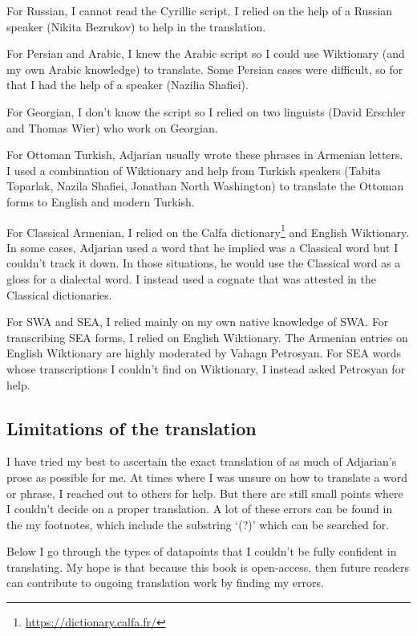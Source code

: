 For Russian, I cannot read the Cyrillic script. I relied on the help of  a Russian speaker (Nikita Bezrukov) to help in the translation. 

For Persian and Arabic, I knew the Arabic script so I could use Wiktionary (and my own Arabic knowledge) to translate. Some Persian cases were difficult, so for that I had the help of a speaker (Nazilia Shafiei). 

For Georgian, I don't know the script so I relied on two linguists (David Erschler and Thomas Wier) who work on Georgian. 

For Ottoman Turkish, Adjarian usually wrote these phrases in Armenian letters. I used a combination of Wiktionary and help from Turkish speakers (Tabita Toparlak,  Nazila Shafiei, Jonathan North Washington) to translate the Ottoman forms to English and modern Turkish. 

For Classical Armenian, I relied on the Calfa dictionary\footnote{\url{https://dictionary.calfa.fr/}} and English Wiktionary. In some cases, Adjarian used a word that he implied was a Classical word but I couldn't track it down. In those situations, he would use the Classical word as a gloss for a  dialectal word. I instead used a cognate that was attested in the Classical dictionaries. 

For SWA and SEA, I relied mainly on my own native knowledge of SWA. For transcribing SEA forms, I relied on English Wiktionary. The Armenian entries on English Wiktionary are highly moderated by Vahagn Petrosyan. For SEA words whose transcriptions I couldn't find on Wiktionary, I instead asked Petrosyan for help. 


\subsection{Limitations of the translation}\label{sec:HossepIntro:translation:limitation}
 


I have tried my best to ascertain the exact translation of as much of Adjarian's prose as possible for me. At times where I was unsure on how to translate a word or phrase, I reached out to others for help. But there are still small points where I couldn't decide on a proper translation. A lot of these errors can be found in the my footnotes, which include the substring `(?)'  which  can be   searched for. 


Below I go through the types of datapoints that I couldn't  be fully confident in translating. My hope is that because this book is open-access, then future readers can contribute to ongoing translation work by finding my errors. 

